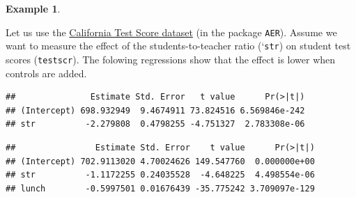 \documentclass[
]{book}
\newenvironment{Shaded}{\begin{snugshade}}{\end{snugshade}}
\newcommand{\AttributeTok}[1]{\textcolor[rgb]{0.77,0.63,0.00}{#1}}
\newcommand{\DecValTok}[1]{\textcolor[rgb]{0.00,0.00,0.81}{#1}}
\newcommand{\FunctionTok}[1]{\textcolor[rgb]{0.00,0.00,0.00}{#1}}
\newcommand{\NormalTok}[1]{#1}
\newcommand{\OtherTok}[1]{\textcolor[rgb]{0.56,0.35,0.01}{#1}}
\newcommand{\SpecialCharTok}[1]{\textcolor[rgb]{0.00,0.00,0.00}{#1}}
\newcommand{\StringTok}[1]{\textcolor[rgb]{0.31,0.60,0.02}{#1}}
\theoremstyle{definition}
\theoremstyle{definition}
\newtheorem{example}{Example}[chapter]
\theoremstyle{definition}
\theoremstyle{definition}
\theoremstyle{remark}
\begin{document}
\begin{example}
\protect\hypertarget{exm:CASchools}{}\label{exm:CASchools}

Let us use the \href{https://rdrr.io/cran/AER/man/CASchools.html}{California Test Score dataset} (in the package \texttt{AER}). Assume we want to measure the effect of the students-to-teacher ratio (`\texttt{str}) on student test scores (\texttt{testscr}). The folowing regressions show that the effect is lower when controls are added.

\begin{Shaded}
\end{Shaded}

\begin{verbatim}
##               Estimate Std. Error   t value      Pr(>|t|)
## (Intercept) 698.932949  9.4674911 73.824516 6.569846e-242
## str          -2.279808  0.4798255 -4.751327  2.783308e-06
\end{verbatim}

\begin{Shaded}
\end{Shaded}

\begin{verbatim}
##                Estimate Std. Error    t value      Pr(>|t|)
## (Intercept) 702.9113020 4.70024626 149.547760  0.000000e+00
## str          -1.1172255 0.24035528  -4.648225  4.498554e-06
## lunch        -0.5997501 0.01676439 -35.775242 3.709097e-129
\end{verbatim}


\end{example}
\end{document}
